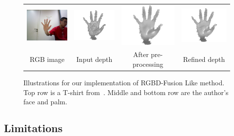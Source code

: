 \begin{figure}[!ht]
{\begin{tabular}{c|c c c}
   \includegraphics[height = 0.19\linewidth]{figures/methodology/rgbd_palm_rgb.pdf} \hspace{0.05cm}
   &
   \includegraphics[height = 0.19\linewidth]{figures/methodology/rgbd_palm_shape_init.pdf} &
   \includegraphics[height = 0.19\linewidth]{figures/methodology/rgbd_palm_shape_smooth.pdf} &
   \includegraphics[height = 0.19\linewidth]{figures/methodology/rgbd_palm_shape.pdf} \\
      {RGB image} & {Input depth} & {After pre-processing} &{Refined depth}                 
 \end{tabular}}
\caption{Illustrations for our implementation of RGBD-Fusion Like method. Top row is a T-shirt from~\cite{han2013high}. Middle and bottom row are the author's face and palm.  }
\label{fig:rgbd_illustration}
\end{figure}


\subsection{Limitations}

